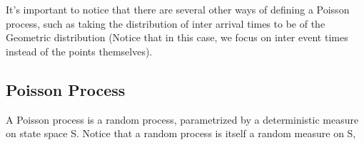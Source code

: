 \documentclass{article}
\begin{document}
It's important to notice that there are several other ways of defining a Poisson process, such as taking the distribution of inter arrival times to be of the Geometric distribution (Notice that in this case, we focus on inter event times instead of the points themselves).

\subsection{Poisson Process}

A Poisson process is a random process, parametrized by a deterministic measure on state space S. Notice that a random process is itself a random measure on S, 
\end{document}
